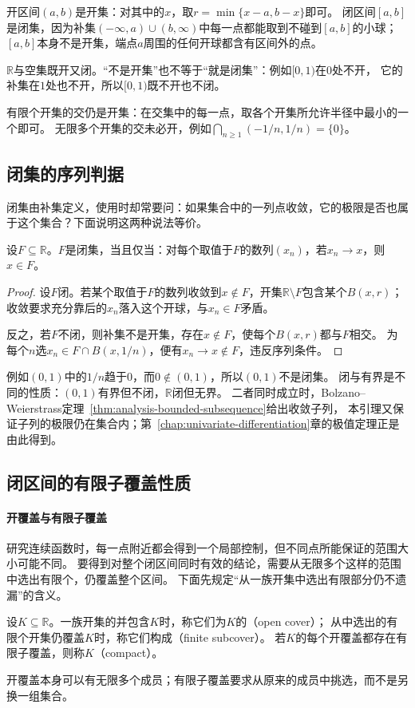 开区间$(a,b)$是开集：对其中的$x$，取$r=\min\{x-a,b-x\}$即可。
闭区间$[a,b]$是闭集，因为补集$(-\infty,a)\cup(b,\infty)$中每一点都能取到不碰到$[a,b]$的小球；
$[a,b]$本身不是开集，端点$a$周围的任何开球都含有区间外的点。

$\mathbb R$与空集既开又闭。“不是开集”也不等于“就是闭集”：例如$[0,1)$在$0$处不开，
它的补集在$1$处也不开，所以$[0,1)$既不开也不闭。

有限个开集的交仍是开集：在交集中的每一点，取各个开集所允许半径中最小的一个即可。
无限多个开集的交未必开，例如$\bigcap_{n\geq1}(-1/n,1/n)=\{0\}$。

\subsection{闭集的序列判据}

闭集由补集定义，使用时却常要问：如果集合中的一列点收敛，它的极限是否也属于这个集合？下面说明这两种说法等价。

\begin{lemma}[闭集的序列判据]
\label{lem:analysis-closed-sequence-criterion}
设$F\subseteq\mathbb R$。$F$是闭集，当且仅当：对每个取值于$F$的数列$(x_n)$，若$x_n\to x$，则$x\in F$。
\end{lemma}
\begin{proof}
设$F$闭。若某个取值于$F$的数列收敛到$x\notin F$，开集$\mathbb R\setminus F$包含某个$B(x,r)$；
收敛要求充分靠后的$x_n$落入这个开球，与$x_n\in F$矛盾。

反之，若$F$不闭，则补集不是开集，存在$x\notin F$，使每个$B(x,r)$都与$F$相交。
为每个$n$选$x_n\in F\cap B(x,1/n)$，便有$x_n\to x\notin F$，违反序列条件。
\end{proof}

例如$(0,1)$中的$1/n$趋于$0$，而$0\notin(0,1)$，所以$(0,1)$不是闭集。
闭与有界是不同的性质：$(0,1)$有界但不闭，$\mathbb R$闭但无界。
二者同时成立时，Bolzano--Weierstrass定理~\ref{thm:analysis-bounded-subsequence}给出收敛子列，
本引理又保证子列的极限仍在集合内；第~\ref{chap:univariate-differentiation}章的极值定理正是由此得到。

\subsection{闭区间的有限子覆盖性质}

\paragraph{开覆盖与有限子覆盖}

研究连续函数时，每一点附近都会得到一个局部控制，但不同点所能保证的范围大小可能不同。
要得到对整个闭区间同时有效的结论，需要从无限多个这样的范围中选出有限个，仍覆盖整个区间。
下面先规定“从一族开集中选出有限部分仍不遗漏”的含义。
\begin{definition}[开覆盖与紧致性]
\label{def:analysis-compactness}
设$K\subseteq\mathbb R$。一族开集的并包含$K$时，称它们为$K$的（open cover）；
从中选出的有限个开集仍覆盖$K$时，称它们构成（finite subcover）。
若$K$的每个开覆盖都存在有限子覆盖，则称$K$（compact）。
\end{definition}
开覆盖本身可以有无限多个成员；有限子覆盖要求从原来的成员中挑选，而不是另换一组集合。

